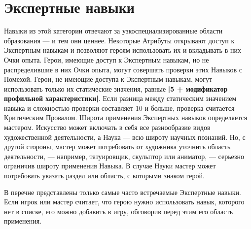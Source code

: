\section{Экспертные навыки}
Навыки из этой категории отвечают за узкоспециализированные области образования — и тем они ценнее. Некоторые Атрибуты открывают доступ к Экспертным навыкам и позволяют героям использовать их и вкладывать в них Очки опыта.
\newline
Герои, имеющие доступ к Экспертным навыкам, но не распределившие в них Очки опыта, могут совершать проверки этих Навыков с Помехой. Герои, не имеющие доступа к Экспертным навыкам, могут использовать только их статические значения, равные \textbf{|5 + модификатор профильной характеристики|}. Если разница между статическим значением навыка и сложностью проверки составляет 10 и больше, проверка считается Критическим Провалом.
\newline
Широта применения Экспертных навыков определяется мастером. Искусство может включать в себя все разнообразие видов художественной деятельности, а Наука — всю широту научных познаний. Но, с другой стороны, мастер может потребовать от художника уточнить область деятельности, — например, татуировщик, скульптор или аниматор, — серьезно ограничив широту применения Навыка. В случае Науки мастер может потребовать указать раздел или область, с которыми знаком герой.
\begin{tcolorbox}
В перечне представлены только самые часто встречаемые Экспертные навыки. Если игрок или мастер считает, что герою нужно использовать навык, которого нет в списке, его можно добавить в игру, обговорив перед этим его область применения.
\end{tcolorbox}

